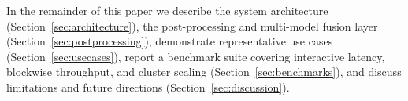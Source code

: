 In the remainder of this paper we describe the system architecture (Section~\ref{sec:architecture}), the post-processing and multi-model fusion layer (Section~\ref{sec:postprocessing}), demonstrate representative use cases (Section~\ref{sec:usecases}), report a benchmark suite covering interactive latency, blockwise throughput, and cluster scaling (Section~\ref{sec:benchmarks}), and discuss limitations and future directions (Section~\ref{sec:discussion}).
